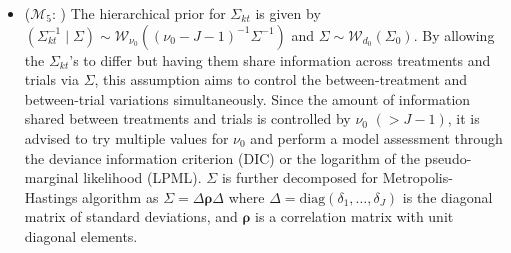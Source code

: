 \begin{itemize}
\item ($\mathcal{M}_5$: ) The hierarchical prior for $\Sigma_{kt}$ is given by $(\Sigma_{kt}^{-1}\mid \Sigma) \sim \mathcal{W}_{\nu_0}((\nu_0-J-1)^{-1}\Sigma^{-1})$ and $\Sigma \sim \mathcal{W}_{d_0}(\Sigma_0)$. By allowing the $\Sigma_{kt}$'s to differ but having them share information across treatments and trials via $\Sigma$, this assumption aims to control the between-treatment and between-trial variations simultaneously. Since the amount of information shared between treatments and trials is controlled by $\nu_0$ $(>J-1)$, it is advised to try multiple values for $\nu_0$ and perform a model assessment through the deviance information criterion (DIC) or the logarithm of the pseudo-marginal likelihood (LPML). $\Sigma$ is further decomposed for Metropolis-Hastings algorithm as $\Sigma=\Delta \boldsymbol{\rho}\Delta$ where $\Delta = \mathrm{diag}(\delta_1,\ldots,\delta_J)$ is the diagonal matrix of standard deviations, and $\boldsymbol{\rho}$ is a correlation matrix with unit diagonal elements. 


\end{itemize}

